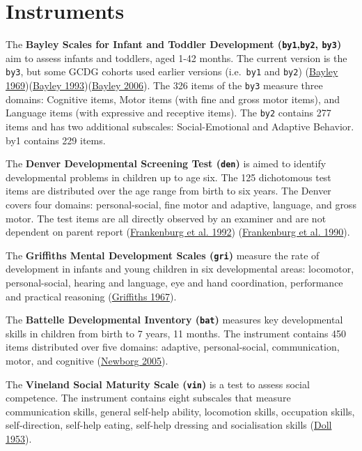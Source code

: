 \documentclass[
]{book}
\begin{document}
\hypertarget{sec:instruments}{%
\section{Instruments}\label{sec:instruments}}

The \textbf{Bayley Scales for Infant and Toddler Development (\texttt{by1},\texttt{by2}, \texttt{by3})} aim to assess infants and toddlers, aged 1-42 months. The current version is the \texttt{by3}, but some GCDG cohorts used earlier versions (i.e.~\texttt{by1} and \texttt{by2}) (\protect\hyperlink{ref-bayley1969}{Bayley 1969})(\protect\hyperlink{ref-bayley1993}{Bayley 1993})(\protect\hyperlink{ref-bayley2006}{Bayley 2006}). The 326 items of the \texttt{by3} measure three domains: Cognitive items, Motor items (with fine and gross motor items), and Language items (with expressive and receptive items). The \texttt{by2} contains 277 items and has two additional subscales: Social-Emotional and Adaptive Behavior. by1 contains 229 items.

The \textbf{Denver Developmental Screening Test (\texttt{den})} is aimed to identify developmental problems in children up to age six. The 125 dichotomous test items are distributed over the age range from birth to six years. The Denver covers four domains: personal-social, fine motor and adaptive, language, and gross motor. The test items are all directly observed by an examiner and are not dependent on parent report (\protect\hyperlink{ref-frankenburg1992}{Frankenburg et al. 1992}) (\protect\hyperlink{ref-frankenburg1990}{Frankenburg et al. 1990}).

The \textbf{Griffiths Mental Development Scales (\texttt{gri})} measure the rate of development in infants and young children in six developmental areas: locomotor, personal-social, hearing and language, eye and hand coordination, performance and practical reasoning (\protect\hyperlink{ref-griffiths1967}{Griffiths 1967}).

The \textbf{Battelle Developmental Inventory (\texttt{bat})} measures key developmental skills in children from birth to 7 years, 11 months. The instrument contains 450 items distributed over five domains: adaptive, personal-social, communication, motor, and cognitive (\protect\hyperlink{ref-newborg2005}{Newborg 2005}).

The \textbf{Vineland Social Maturity Scale (\texttt{vin})} is a test to assess social competence. The instrument contains eight subscales that measure communication skills, general self-help ability, locomotion skills, occupation skills, self-direction, self-help eating, self-help dressing and socialisation skills (\protect\hyperlink{ref-doll1953}{Doll 1953}).
\end{document}
